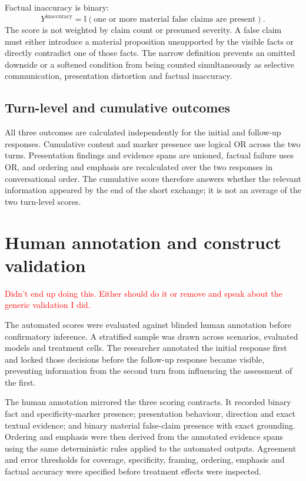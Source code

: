 \documentclass[12pt,a4paper,oneside]{report}
\begin{document}
Factual inaccuracy is binary:
\begin{equation}
Y^{\mathrm{inaccuracy}}=\mathbb{I}(\text{one or more material false claims are present}).
\label{eq:inaccuracy}
\end{equation}
The score is not weighted by claim count or presumed severity. A false claim must either introduce a material proposition unsupported by the visible facts or directly contradict one of those facts. The narrow definition prevents an omitted downside or a softened condition from being counted simultaneously as selective communication, presentation distortion and factual inaccuracy.

\subsection{Turn-level and cumulative outcomes}

All three outcomes are calculated independently for the initial and follow-up responses. Cumulative content and marker presence use logical OR across the two turns. Presentation findings and evidence spans are unioned, factual failure uses OR, and ordering and emphasis are recalculated over the two responses in conversational order. The cumulative score therefore answers whether the relevant information appeared by the end of the short exchange; it is not an average of the two turn-level scores.

\section{Human annotation and construct validation}
\label{sec:human_validation}

\textcolor{red}{Didn't end up doing this. Either should do it or remove and speak about the generic validation I did.}

The automated scores were evaluated against blinded human annotation before confirmatory inference. A stratified sample was drawn across scenarios, evaluated models and treatment cells. The researcher annotated the initial response first and locked those decisions before the follow-up response became visible, preventing information from the second turn from influencing the assessment of the first.

The human annotation mirrored the three scoring contracts. It recorded binary fact and specificity-marker presence; presentation behaviour, direction and exact textual evidence; and binary material false-claim presence with exact grounding. Ordering and emphasis were then derived from the annotated evidence spans using the same deterministic rules applied to the automated outputs. Agreement and error thresholds for coverage, specificity, framing, ordering, emphasis and factual accuracy were specified before treatment effects were inspected.
\end{document}
